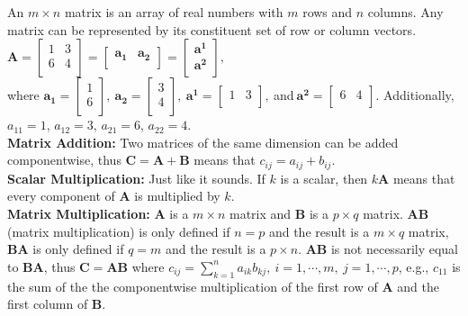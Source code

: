 \bigskip  An $m \times n$ matrix is an array of real numbers with $m$ rows and $n$ columns. Any matrix can be represented by its constituent set of row or column vectors. \\

$\mathbf{A} =
\left[
  \begin{array}{cc}
    1 & 3 \\
    6 & 4 \\
  \end{array}
\right]     =
\left[
  \begin{array}{cc}
  \mathbf{a_1} & \mathbf{a_2} \\
  \end{array}
\right]     =
\left[
  \begin{array}{c}
  \mathbf{a^1} \\
  \mathbf{a^2} \\
  \end{array}
\right], $ \\

\noindent where
$\mathbf{a_1} =
\left[
  \begin{array}{c}
  1 \\
  6 \\
  \end{array}
\right],~ \mathbf{a_2} =
\left[
  \begin{array}{c}
  3 \\
  4 \\
  \end{array} \right],~
\mathbf{a^1} =
\left[\begin{array}{cc}
  1 & 3 \\
\end{array} \right],~ $and$~
\mathbf{a^2} = \left[\begin{array}{cc}
  6 & 4 \\
\end{array} \right]$.  Additionally, $a_{11} = 1$, $a_{12} = 3$, $a_{21} = 6$, $a_{22} = 4$. \\

{\bf Matrix Addition:} Two matrices of the same dimension can be added componentwise, thus $\mathbf{C} = \mathbf{A} + \mathbf{B}$ means that $c_{ij} = a_{ij} + b_{ij}$. \\

{\bf Scalar Multiplication:} Just like it sounds. If $k$ is a scalar, then $k\mathbf{A}$ means that every component of $\mathbf{A}$ is multiplied by $k$. \\

{\bf Matrix Multiplication:} $\mathbf{A}$ is a $m \times n$ matrix and $\mathbf{B}$ is a $p \times q$ matrix.  $\mathbf{AB}$ (matrix multiplication) is only defined if $n = p$ and the result is a $m \times q$ matrix, $\mathbf{BA}$ is only defined if $q = m$ and the result is a $p \times n$. $\mathbf{AB}$ is not necessarily equal to $\mathbf{BA}$, thus $\mathbf{C} = \mathbf{AB}$ where $c_{ij} = \sum_{k=1}^n a_{ik}b_{kj},~ i=1,\cdots,m,~ j=1,\cdots,p$, e.g., $c_{11}$ is the sum of the the componentwise multiplication of the first row of $\mathbf{A}$ and the first column of $\mathbf{B}$. \\


